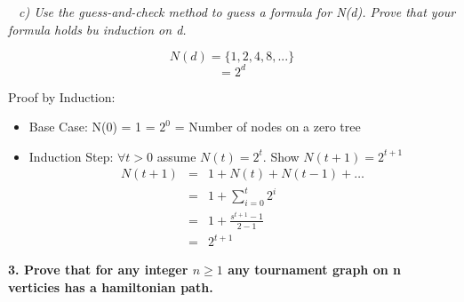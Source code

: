 \documentclass[12pt, letterpaper]{article}
\begin{document}
\-\ \it{ c) Use the guess-and-check method to guess a formula for N(d). Prove that your formula holds bu induction on d. }

\[N(d) = \{1, 2, 4, 8, ...\}\]
\[ = 2^d \]

\textnormal{Proof by Induction:}
\begin{itemize}
  \item \textnormal{Base Case:} \newline
  N(0) = 1 = \(2^0\) = Number of nodes on a zero tree \newline

  \item \textnormal{ Induction Step: } \newline
  \textnormal{ \(\forall t > 0 \) assume \(N(t) = 2^t\). Show \(N(t + 1) = 2^{t + 1}\) } \\
  \begin{eqnarray*}
    N(t + 1) &=& 1 + N(t) + N(t - 1) + \dots \\
    &=& 1 + \sum_{i = 0}^{t} 2^i \\
    &=& 1 + \frac{s^{t + 1} - 1}{2 - 1} \\
    &=& 2^{t + 1}
  \end{eqnarray*}

\end{itemize}

\newpage
\bf{ 3. Prove that for any integer \(n \ge 1\) any tournament graph on n verticies has a hamiltonian path. }
\end{document}
